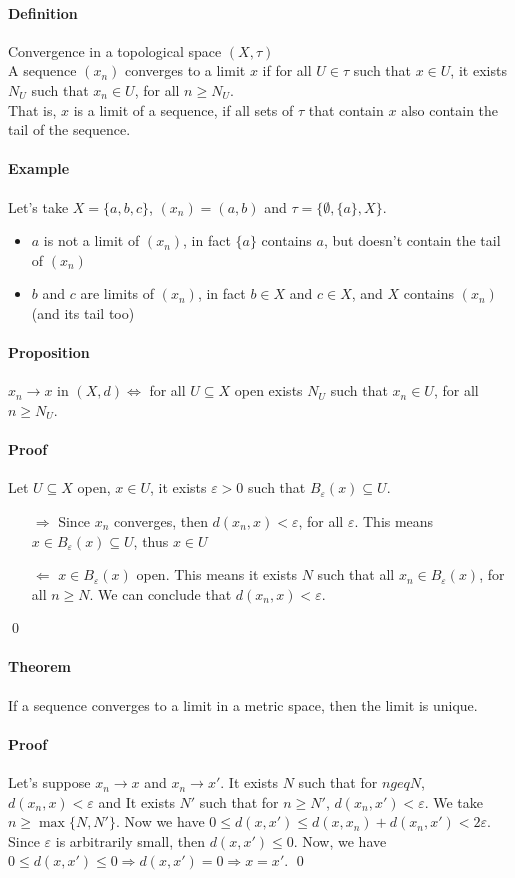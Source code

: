 \documentclass{article}
\newcommand{\Ep}{\varepsilon}
\newcommand{\Def}{\paragraph{Definition}}
\newcommand{\Proposition}{\paragraph{Proposition}}
\newcommand{\Theorem}{\paragraph{Theorem}}
\newcommand{\Proof}{\paragraph{Proof}}
\newcommand{\Example}{\paragraph{Example}}
\begin{document}
	\Def Convergence in a topological space $(X, \tau)$
\\A sequence $(x_n)$ converges to a limit $x$ if for all $U \in \tau$ such that
	$x \in U$, it exists $N_U$ such that $x_n \in U$, for all $n \geq N_U$.
\\That is, $x$ is a limit of a sequence, if all sets of $\tau$ that contain $x$
	also contain the tail of the sequence.

	\Example Let's take $X = \{ a, b, c \}$, $(x_n) = (a, b)$ and $\tau =
	\{ \emptyset, \{ a \}, X \}$.
	\begin{itemize}
		\item $a$ is not a limit of $(x_n)$, in fact $\{ a \}$ contains $a$, but
		doesn't contain the tail of $(x_n)$
		\item $b$ and $c$ are limits of $(x_n)$, in fact $b \in X$ and $c \in X$,
		and $X$ contains $(x_n)$ (and its tail too)
	\end{itemize}

	\Proposition $x_n \to x$ in $(X, d) \iff$ for all $U \subseteq X$ open exists
	$N_U$ such that $x_n \in U$, for all $n \geq N_U$.

	\Proof Let $U \subseteq X$ open, $x \in U$, it exists $\Ep > 0$ such that
	$B_\Ep(x) \subseteq U$.
	\begin{itemize}
		\item[$\Rightarrow$] Since $x_n$ converges, then $d(x_n,x) < \Ep$, for
		all $\Ep$. This means $x \in B_\Ep(x) \subseteq U$, thus $x \in U$
		\item[$\Leftarrow$] $x \in B_\Ep(x)$ open. This means it exists $N$ such
		that all $x_n \in B_\Ep(x)$, for all $n \geq N$. We can conclude that
		$d(x_n,x) < \Ep$.
	\end{itemize}
	\qed

	\Theorem If a sequence converges to a limit in a metric space, then the limit
	is unique.

	\Proof Let's suppose $x_n \to x$ and $x_n \to x'$.
	It exists $N$ such that for $n geq N$, $d(x_n,x) < \Ep$ and It exists
	$N'$ such that for $n \geq N'$, $d(x_n,x') < \Ep$. We take $n \geq
	\max\{ N, N' \}$. Now we have $0 \leq d(x,x') \leq d(x,x_n) + d(x_n,x') <
	2\Ep$.
\\Since $\Ep$ is arbitrarily small, then $d(x,x') \leq 0$. Now, we have
	$0 \leq d(x,x') \leq 0 \Rightarrow d(x,x') = 0 \Rightarrow x = x'$.
	\qed
\end{document}
